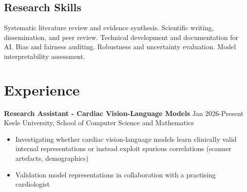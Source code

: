 \documentclass[10pt,a4paper]{article}
\begin{document}
\subsection{Research Skills}
Systematic literature review and evidence synthesis. Scientific writing, dissemination, and peer review. Technical development and documentation for AI. Bias and fairness auditing. Robustness and uncertainty evaluation. Model interpretability assessment.

\section{Experience}

\textbf{Research Assistant - Cardiac Vision-Language Models} \hfill Jan 2026-Present\\
Keele University, School of Computer Science and Mathematics
\begin{itemize}
\item Investigating whether cardiac vision-language models learn clinically valid internal representations or instead exploit spurious correlations (scanner artefacts, demographics)
\item Validation model representations in collaboration with a practising cardiologist
\end{itemize}
\end{document}

